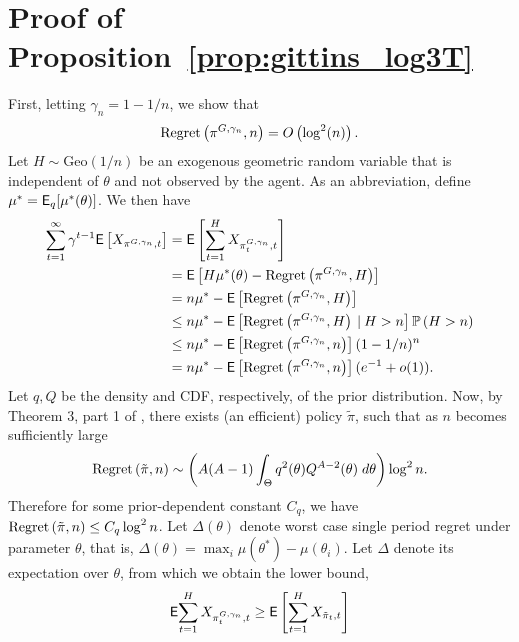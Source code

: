 \section{Proof of Proposition~\ref{prop:gittins_log3T}} \label{proof:prop_log3T}
\begin{myproof}[Proof.]
	First, letting $\gamma_n = 1 - 1/n$, we show that
	\begin{equation} \label{eq:basic_finite_time_gittins}
	\textnormal{Regret} \left( \pi^{G, \gamma_n}, n \right) = O\left( \log^2(n) \right).
	\end{equation}
	Let $H \sim \text{Geo}(1/n)$ be an exogenous geometric random variable that is independent of $\theta$ and not observed by the agent. As an abbreviation, define $\mu^* = \mathsf{E}_{q}[\mu^*(\theta)]$. We then have
	\begin{align}
	\sum_{t=1}^\infty \gamma^{t-1} \mathsf{E}\left[X_{\pi^{G,\gamma_n},t}\right] & = \mathsf{E}\left[\sum_{t=1}^H X_{\pi^{G,\gamma_n}_t,t}\right] \nonumber \\
	& =  \mathsf{E}\left[H \mu^*(\theta) -\textnormal{Regret} \left( \pi^{G,\gamma_n}, H \right)\right] \\
	& =  n \mu^* - \mathsf{E}\left[\textnormal{Regret} \left( \pi^{G,\gamma_n}, H \right)\right] \nonumber \\
	& \le n \mu^* - \mathsf{E}\left[\textnormal{Regret} \left( \pi^{G,\gamma_n}, H \right) \:\vert\: H > n\right]\mathbb{P} \left( H > n \right) \nonumber \\
	& \le n \mu^* - \mathsf{E}\left[\textnormal{Regret} \left( \pi^{G,\gamma_n}, n \right)\right](1-1/n)^n \nonumber \\
	& = n \mu^* - \mathsf{E}\left[\textnormal{Regret} \left( \pi^{G,\gamma_n}, n \right)\right](e^{-1} + o(1)) \label{bound:geometric_regret1}.
	\end{align}
	Let $q, Q$ be the density and CDF, respectively, of the prior distribution. Now, by Theorem 3, part 1 of \cite{lai1987adaptive}, there exists (an efficient) policy $\tilde \pi$, such that as $n$ becomes sufficiently large
	\begin{equation*}
	\textnormal{Regret} \left( \tilde \pi, n \right) \sim \left( A(A-1)  \int_\Theta q^2(\theta) Q^{A-2}(\theta) \; d\theta \right) \log^2 n.
	\end{equation*}
	Therefore for some prior-dependent constant $C_q$, we have $\textnormal{Regret} \left( \tilde \pi, n \right) \le C_q \log^2 n$. Let $\Delta(\theta)$ denote worst case  single period regret under parameter $\theta$, that is, $\Delta(\theta) =  \max_{i} \mu(\theta^*) - \mu(\theta_i)$. Let $\Delta$ denote its expectation over $\theta$, from which we obtain the lower bound,
	\begin{align}
	\E{\sum_{t=1}^H X_{\pi^{G,\gamma_n}_t,t}} & \ge \E\left[\sum_{t=1}^H X_{ \tilde \pi_t,t}\right] \label{bound:gittins_optimality}\\

\end{align}
\end{myproof}
